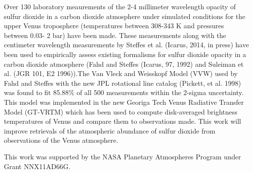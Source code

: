 \documentclass[12pt]{article}
\begin{document}
\maketitle
\doublespacing
Over 130 laboratory meaurements of the 2-4 millimeter wavelength opacity of sulfur dioxide in a carbon dioxide atmosphere under simulated conditions for the upper Venus troposphere (temperatures between 308-343 K and pressures between 0.03- 2 bar) have been made. These measurements along with the centimeter wavelength measurements by Steffes et al. (Icarus, 2014, in press) have been used to empirically assess existing  formalisms for sulfur dioxide opacity in a carbon dioxide atmosphere (Fahd and Steffes (Icarus, 97, 1992) and Suleiman et al. (JGR 101, E2 1996)).The Van Vleck and Weisskopf Model (VVW) used by Fahd and Steffes with the new JPL rotational line catalog (Pickett, et al. 1998) was found to fit 85.88\% of all 500 measurements within the 2-sigma uncertainty. This model was implemented in the new Georiga Tech Venus Radiative Transfer Model (GT-VRTM) which has been used to compute disk-averaged brightness temperatures of Venus and compare them to observations made. This work will improve retrievals of the atmospheric abundance of sulfur dioxide from observations of the Venus atmosphere. 

This work was supported by the NASA Planetary Atmospheres Program under Grant NNX11AD66G.
\end{document}
